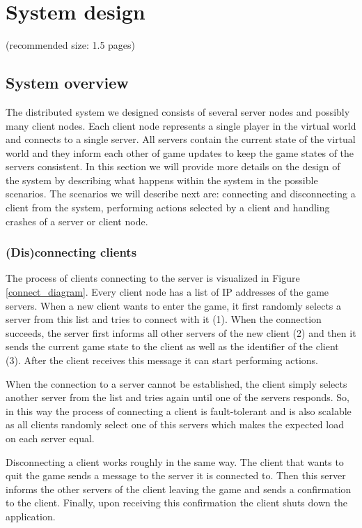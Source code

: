 \section{System design}
(recommended size: 1.5 pages)

\subsection{System overview}
The distributed system we designed consists of several server nodes and possibly many client nodes. Each client node represents a single player in the virtual world and connects to a single server. All servers contain the current state of the virtual world and they inform each other of game updates to keep the game states of the servers consistent. In this section we will provide more details on the design of the system by describing what happens within the system in the possible scenarios. The scenarios we will describe next are: connecting and disconnecting a client from the system, performing actions selected by a client and handling crashes of a server or client node.

\subsubsection*{(Dis)connecting clients}
The process of clients connecting to the server is visualized in Figure \ref{connect_diagram}. Every client node has a list of IP addresses of the game servers. When a new client wants to enter the game, it first randomly selects a server from this list and tries to connect with it (1). When the connection succeeds, the server first informs all other servers of the new client (2) and then it sends the current game state to the client as well as the identifier of the client (3). After the client receives this message it can start performing actions.

When the connection to a server cannot be established, the client simply selects another server from the list and tries again until one of the servers responds. So, in this way the process of connecting a client is fault-tolerant and is also scalable as all clients randomly select one of this servers which makes the expected load on each server equal.

Disconnecting a client works roughly in the same way. The client that wants to quit the game sends a message to the server it is connected to. Then this server informs the other servers of the client leaving the game and sends a confirmation to the client. Finally, upon receiving this confirmation the client shuts down the application.

